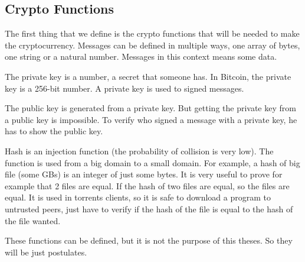 \subsection{Crypto Functions}
The first thing that we define is the crypto functions that will be needed to make the cryptocurrency.
Messages can be defined in multiple ways, one array of bytes, one string or a natural number.
Messages in this context means some data.

The private key is a number, a secret that someone has.
In Bitcoin, the private key is a 256-bit number.
A private key is used to signed messages.

The public key is generated from a private key.
But getting the private key from a public key is impossible.
To verify who signed a message with a private key, he has to show the public key.

Hash is an injection function (the probability of collision is very low).
The function is used from a big domain to a small domain.
For example, a hash of big file (some GBs) is an integer of just some bytes.
It is very useful to prove for example that 2 files are equal.
If the hash of two files are equal, so the files are equal.
It is used in torrents clients, so it is safe to download a program to untrusted peers,
just have to verify if the hash of the file is equal to the hash of the file wanted.

These functions can be defined, but it is not the purpose of this theses.
So they will be just postulates.

